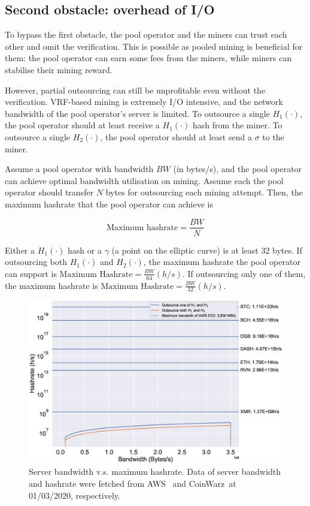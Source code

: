 \subsection{Second obstacle: overhead of I/O}
To bypass the first obstacle, the pool operator and the miners can trust each other and omit the verification.
This is possible as pooled mining is beneficial for them: the pool operator can earn some fees from the miners, while miners can stabilise their mining reward.

However, partial outsourcing can still be unprofitable even without the verification.
VRF-based mining is extremely I/O intensive, and the network bandwidth of the pool operator's server is limited.
To outsource a single $H_1(\cdot)$, the pool operator should at least receive a $H_1(\cdot)$ hash from the miner.
To outsource a single $H_2(\cdot)$, the pool operator should at least send a $\sigma$ to the miner.

Assume a pool operator with bandwidth $BW$ (in bytes/s), and the pool operator can achieve optimal bandwidth utilisation on mining.
Assume each the pool operator should transfer $N$ bytes for outsourcing each mining attempt.
Then, the maximum hashrate that the pool operator can achieve is

$$\text{Maximum hashrate} = \frac{BW}{N}$$

Either a $H_1(\cdot)$ hash or a $\gamma$ (a point on the elliptic curve) is at least 32 bytes.
If outsourcing both $H_1(\cdot)$ and $H_2(\cdot)$, the maximum hashrate the pool operator can support is $\text{Maximum Hashrate} = \frac{BW}{64} (h/s)$.
If outsourcing only one of them, the maximum hashrate is $\text{Maximum Hashrate} = \frac{BW}{32} (h/s)$.

\begin{figure}[htp]
    \centering
    \includegraphics[width=.8\linewidth]{figs/max-hashrate.eps}
    \caption{Server bandwidth v.s. maximum hashrate. Data of server bandwidth and hashrate were fetched from AWS~\cite{aws} and CoinWarz~\cite{coinwarz}at 01/03/2020, respectively.}
    \label{fig:max-hashrate}
\end{figure}

